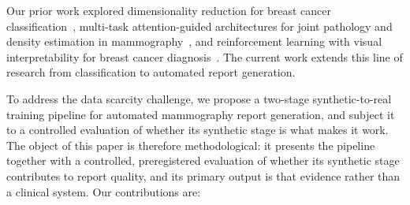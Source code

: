 \documentclass{wlscirep}
\begin{document}
Our prior work explored dimensionality reduction for breast cancer classification~\cite{esen2024pca}, multi-task attention-guided architectures for joint pathology and density estimation in mammography~\cite{esen2025multitask}, and reinforcement learning with visual interpretability for breast cancer diagnosis~\cite{esen2025rl}. The current work extends this line of research from classification to automated report generation.

To address the data scarcity challenge, we propose a two-stage synthetic-to-real training pipeline for automated mammography report generation, and subject it to a controlled evaluation of whether its synthetic stage is what makes it work. The object of this paper is therefore methodological: it presents the pipeline together with a controlled, preregistered evaluation of whether its synthetic stage contributes to report quality, and its primary output is that evidence rather than a clinical system. Our contributions are:
\end{document}
